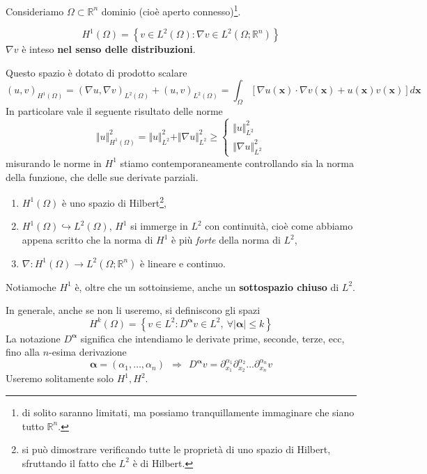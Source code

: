 \documentclass[10pt,a4paper,twoside,openright]{book}
\newcommand{\x}{\mathbf{x}}
\begin{document}
Consideriamo $\Omega \subset \mathbb{R}^{n}$ dominio (cioè aperto connesso)\footnote{di solito saranno limitati, ma possiamo tranquillamente immaginare che siano tutto $\mathbb{R}^{n}$.}.
\begin{definition}
	\begin{equation*}
		H^{1}( \Omega ) =\left\{v\in L^{2}( \Omega ) :\nabla v\in L^{2}\left( \Omega ;\mathbb{R}^{n}\right)\right\}
	\end{equation*}
	$\nabla v$ è inteso \textbf{nel senso delle distribuzioni}.
\end{definition}
Questo spazio è dotato di prodotto scalare
\begin{equation*}
	( u,v)_{H^{1}( \Omega )} =( \nabla u,\nabla v)_{L^{2}( \Omega )} +( u,v)_{L^{2}( \Omega )} =\int _{\Omega }[ \nabla u(\x) \cdotp \nabla v(\x) +u(\x) v(\x)] d\x
\end{equation*}
In particolare vale il seguente risultato delle norme
\begin{equation*}
	\Vert u\Vert ^{2}_{H^{1}( \Omega )} =\Vert u\Vert ^{2}_{L^{2}} +\Vert \nabla u\Vert ^{2}_{L^{2}} \geqslant \begin{cases}
	\Vert u\Vert ^{2}_{L^{2}}\\
	\Vert \nabla u\Vert ^{2}_{L^{2}}
	\end{cases}
\end{equation*}
misurando le norme in $H^{1}$ stiamo contemporaneamente controllando sia la norma della funzione, che delle sue derivate parziali.
\begin{theorem}
	[Microteorema]
	\begin{enumerate}
		\item $H^{1}( \Omega )$ è uno spazio di Hilbert\footnote{si può dimostrare verificando tutte le proprietà di uno spazio di Hilbert, sfruttando il fatto che $L^{2}$ è di Hilbert.},
		\item $H^{1}( \Omega ) \hookrightarrow L^{2}( \Omega )$, $H^{1}$ si immerge in $L^{2}$ con continuità, cioè come abbiamo appena scritto che la norma di $H^{1}$ è più \textit{forte} della norma di $L^{2}$,
		\item $\nabla :H^{1}( \Omega )\rightarrow L^{2}\left( \Omega ;\mathbb{R}^{n}\right)$ è lineare e continuo.
	\end{enumerate}
\end{theorem}

Notiamoche $H^{1}$ è, oltre che un sottoinsieme, anche un \textbf{sottospazio chiuso} di $L^{2}$.

In generale, anche se non li useremo, si definiscono gli spazi
\begin{equation*}
	H^{k}( \Omega ) =\left\{v\in L^{2} :D^{\mathbf{\alpha }} v\in L^{2} ,\ \forall | \mathbf{\alpha }| \leqslant k\right\}
\end{equation*}
La notazione $D^{\mathbf{\alpha }}$ significa che intendiamo le derivate prime, seconde, terze, ecc, fino alla $n$-esima derivazione
\begin{equation*}
	\mathbf{\alpha } =( \alpha _{1} ,\dotsc ,\alpha _{n}) \ \ \Rightarrow \ \ D^{\mathbf{\alpha }} v=\partial ^{\alpha _{1}}_{x_{1}} \partial ^{\alpha _{2}}_{x_{2}} \dotsc \partial ^{\alpha _{n}}_{x_{n}} v
\end{equation*}
Useremo solitamente solo $H^{1} ,H^{2}$.
\end{document}

